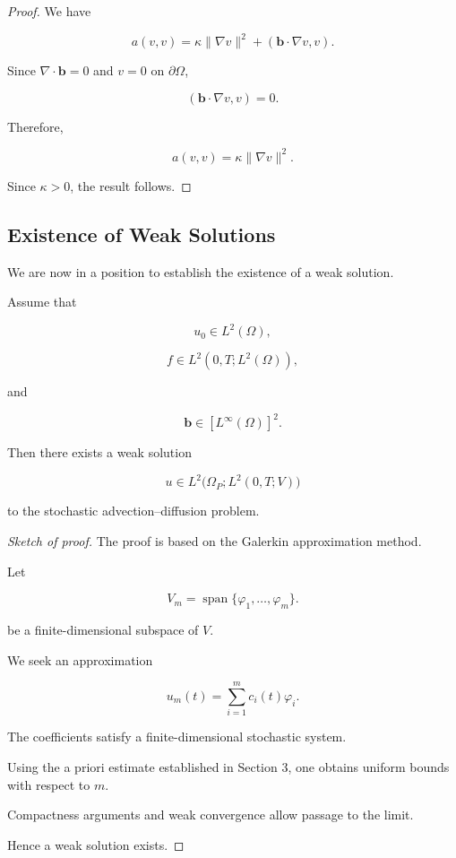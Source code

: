 \begin{proof}

We have

\[
a(v,v)
=
\kappa\|\nabla v\|^2
+
(\mathbf b\cdot\nabla v,v).
\]

Since $\nabla\cdot\mathbf b=0$ and $v=0$ on $\partial\Omega$,

\[
(\mathbf b\cdot\nabla v,v)=0.
\]

Therefore,

\[
a(v,v)
=
\kappa
\|\nabla v\|^2.
\]

Since $\kappa>0$, the result follows.
\end{proof}

\subsection{Existence of Weak Solutions}

We are now in a position to establish the existence of a weak solution.

\begin{theorem}
Assume that

\[
u_0\in L^2(\Omega),
\]

\[
f\in L^2(0,T;L^2(\Omega)),
\]

and

\[
\mathbf b\in [L^\infty(\Omega)]^2.
\]

Then there exists a weak solution

\[
u
\in
L^2\bigl(
\Omega_P;
L^2(0,T;V)
\bigr)
\]

to the stochastic advection--diffusion problem.
\end{theorem}

\begin{proof}[Sketch of proof]

The proof is based on the Galerkin approximation method.

Let

\[
V_m
=
\operatorname{span}
\{\varphi_1,\ldots,\varphi_m\}.
\]

be a finite-dimensional subspace of $V$.

We seek an approximation

\[
u_m(t)
=
\sum_{i=1}^{m}
c_i(t)\varphi_i.
\]

The coefficients satisfy a finite-dimensional stochastic system.

Using the a priori estimate established in Section 3, one obtains uniform bounds with respect to $m$.

Compactness arguments and weak convergence allow passage to the limit.

Hence a weak solution exists.
\end{proof}

